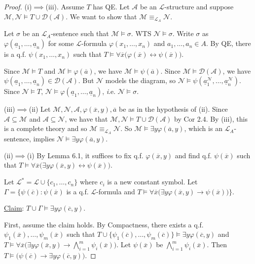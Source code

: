 \documentclass[]{article}
\theoremstyle{custhm}
\theoremstyle{cusdef}
\theoremstyle{custhm}
\theoremstyle{custhm}
\theoremstyle{custhm}
\theoremstyle{ex}
\theoremstyle{custhm}
\theoremstyle{cusdef}
\theoremstyle{remark}
\theoremstyle{remark}
\renewcommand{\L}{\mathcal{L}}
\renewcommand{\it}[1]{\textit{#1}}
\newcommand{\M}{\mathcal{M}}
\renewcommand{\phi}{\varphi}
\renewcommand{\bar}{\overline}
\newcommand{\N}{\mathcal{N}}
\newcommand{\A}{\mathcal{A}}
\newcommand{\D}{\mathcal{D}}
\renewcommand{\subset}{\subseteq}
\begin{document}
\begin{proof}
(i)$\implies$(iii). Assume $T$ has QE. Let $\A$ be an $\L$-structure and suppose $\M,\N\models T\cup \D(\A)$. We want to show that $\M \equiv_{\L_A} \N$.

Let $\sigma$ be an $\L_A$-sentence such that $\M\models \sigma$. WTS $\N\models \sigma$. Write $\sigma$ as $\phi(\underline{a}_1,\dots,\underline{a}_n)$ for some $\L$-formula $\phi(x_1,\dots,x_n)$ and $a_1,\dots,a_n\in A$. By QE, there is a q.f. $\psi(x_1,\dots,x_n)$ such that $T\models \forall \bar{x}\big(\phi(\bar{x})\leftrightarrow \psi(\bar{x})\big)$.

Since $\M\models T$ and $\M\models \phi(\bar{a})$, we have $\M\models \psi(\bar{a})$. Since $\M\models\D(\A)$, we have $\psi(\underline{a}_1,\dots,\underline{a}_n)\in\D(\A)$. But $\N$ models the diagram, so $\N\models\psi(\underline{a}_1^\N,\dots,\underline{a}_n^\N)$. Since $\N\models T$, $\N\models \phi(\underline{a}_1,\dots,\underline{a}_n)$, {\it i.e.} $\N\models \sigma$.

(iii)$\implies$(ii) Let $\M,\N,\A,\phi(\bar{x},y),\bar{a}$ be as in the hypothesis of (ii). Since $\A\subset \M$ and $\A\subset \N$, we have that $\M,\N\models T\cup \D(\A)$ by Cor 2.4. By (iii), this is a complete theory and so $\M\equiv_{\L_A}\N$. So $\M\models \exists y\phi(\bar{a},y)$, which is an $\L_A$-sentence, implies $\N\models \exists y \phi(\bar{a},y)$.

(ii)$\implies$(i) By Lemma 6.1, it suffices to fix q.f. $\phi(\bar{x},y)$ and find q.f. $\psi(\bar{x})$ such that $T\models \forall \bar{x}\big(\exists y \phi(\bar{x},y)\leftrightarrow\psi(\bar{x})\big)$.

Let $\L^\ast = \L \cup \{c_1,\dots,c_n\}$ where $c_i$ is a new constant symbol. Let $\Gamma = \{\psi(\bar{c}): \psi(\bar{x})$ is a q.f. $\L$-formula and $T\models \forall\bar{x} \big(\exists y\phi(\bar{x},y)\rightarrow \psi(\bar{x})\big)\}$.

\underline{Claim}: $T\cup \Gamma \models \exists y\phi(\bar{c},y)$.

First, assume the claim holds. By Compactness, there exists a q.f. $\psi_1(\bar{x}),\dots,\psi_m(\bar{x})$ such that $T\cup\{\psi_1(\bar{c}),\dots,\psi_m(\bar{c})\}\models \exists y\phi(\bar{c},y)$ and $T\models \forall \bar{x}\big(\exists y\phi(\bar{x},y)\rightarrow \bigwedge_{i=1}^{m}\psi_i(\bar{x})\big)$. Let $\psi(\bar{x})$ be $\bigwedge_{i=1}^{m}\psi_i(\bar{x})$. Then $T\models \big(\psi(\bar{c}) \rightarrow \exists y\phi(\bar{c},y)\big)$.


\end{proof}
\end{document}
